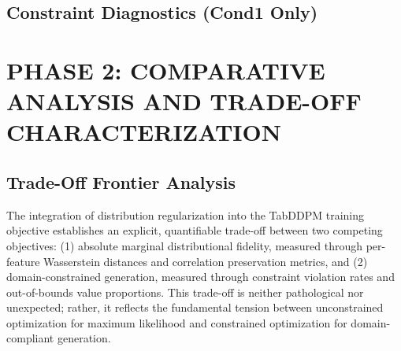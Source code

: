 \documentclass[10pt,conference,a4paper]{IEEEtran}
\begin{document}
\subsection{Constraint Diagnostics (Cond1 Only)}
\begin{table}[htbp]
\centering
\caption{\textbf{Cond1 Constraint Violation Diagnostics}}
\label{tab:constraint_diag}
\end{table}

\section{PHASE 2: COMPARATIVE ANALYSIS AND TRADE-OFF CHARACTERIZATION}

\subsection{Trade-Off Frontier Analysis}
The integration of distribution regularization into the TabDDPM training objective establishes an explicit, quantifiable trade-off between two competing objectives: (1) absolute marginal distributional fidelity, measured through per-feature Wasserstein distances and correlation preservation metrics, and (2) domain-constrained generation, measured through constraint violation rates and out-of-bounds value proportions. This trade-off is neither pathological nor unexpected; rather, it reflects the fundamental tension between unconstrained optimization for maximum likelihood and constrained optimization for domain-compliant generation.
\end{document}
